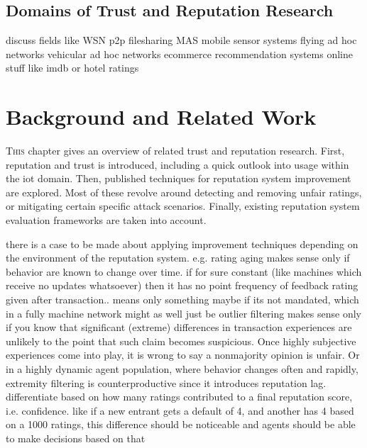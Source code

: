 \documentclass[%
    ]{\PathToTumTemplate/thesis/tum_thesis}
\begin{document}
\section{Domains of Trust and Reputation Research}

discuss fields like 
WSN
\gls{p2p} filesharing
MAS
mobile sensor systems
flying ad hoc networks
vehicular ad hoc networks
ecommerce
recommendation systems online stuff like imdb or hotel ratings

\fi



\chapter{Background and Related Work}\label{chap:related_work}


\lettrine{T}{his} chapter gives an overview of related trust and reputation research.
First, reputation and trust is introduced, including a quick outlook into usage within the \gls{iot} domain.
Then, published techniques for reputation system improvement are explored.
Most of these revolve around detecting and removing unfair ratings, or mitigating certain specific attack scenarios.
Finally, existing reputation system evaluation frameworks are taken into account.


\iffalse
there is a case to be made about applying improvement techniques depending on the environment of the reputation system. e.g.
rating aging makes sense only if behavior are known to change over time. if for sure constant (like machines which receive no updates whatsoever) then it has no point
frequency of feedback rating given after transaction.. means only something maybe if its not mandated, which in a fully machine network might as well just be
outlier filtering makes sense only if you know that significant (extreme) differences in transaction experiences are unlikely to the point that such claim becomes suspicious. Once highly subjective experiences come into play, it is wrong to say a nonmajority opinion is unfair. Or in a highly dynamic agent population, where behavior changes often and rapidly, extremity filtering is counterproductive since it introduces reputation lag.
differentiate based on how many ratings contributed to a final reputation score, i.e. confidence. like if a new entrant gets a default of 4, and another has 4 based on a 1000 ratings, this difference should be noticeable and agents should be able to make decisions based on that
\end{document}
